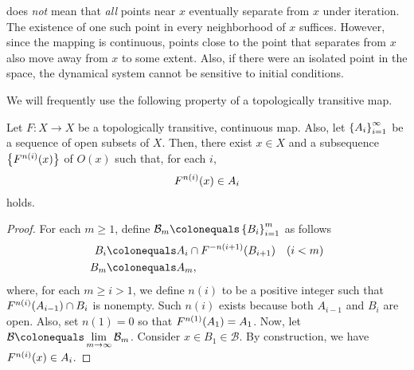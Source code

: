 \documentclass[10pt,draft,twoside]{book}
\begin{document}
%
\sdic does \textit{not} mean that \textit{all} points near $x$ eventually separate from $x$ under iteration.
The existence of one such point in every neighborhood of $x$ suffices.
However, since the mapping is continuous, points close to the point that separates from $x$ also move away from $x$ to some extent.
Also, if there were an isolated point in the space, the dynamical system cannot be sensitive to initial conditions.

We will frequently use the following property of a topologically transitive map.
\begin{proposition}
  Let $F: X \to X$ be a topologically transitive, continuous map.
  Also, let $\left \{ A_i \right \}^{\infty}_{i=1}$ be a sequence of open subsets of $X$.
  Then, there exist $x \in X$ and a subsequence $\left \{ F^{n(i)}(x) \right \}$ of $O(x)$ such that, for each $i$,
  \begin{equation*}
    F^{n(i)}(x) \in A_i
  \end{equation*}
  holds.
  \label{prop:transitivity}
  \begin{proof}
    For each $m \geq 1$, define $\mathcal{B}_m \ceq \seq{B_i}{m}{i=1}$ as follows
    \begin{align*}
      B_i &\ceq A_{i} \cap \itr{F}{-n(i+1)} (B_{i+1}) \quad (i < m) \\
      B_m &\ceq A_m,
    \end{align*}
    where, for each $m \geq i > 1$, we define $n(i)$ to be a positive integer such that $F^{n(i)}(A_{i-1}) \cap B_i$ is nonempty.
    Such $n(i)$ exists because both $A_{i-1}$ and $B_i$ are open.
    Also, set $n(1) = 0$ so that $F^{n(1)}(A_1) = A_1$.
    Now, let $\mathcal{B} \ceq \lim\limits_{m \to \infty} \mathcal{B}_m$.
    Consider $x \in B_1 \in \mathcal{B}$.
    By construction, we have $F^{n(i)}(x) \in A_i$.
  \end{proof}
\end{proposition}
\end{document}
